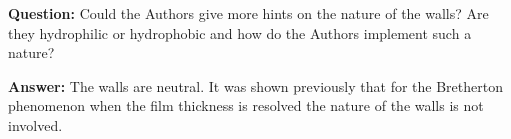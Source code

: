 \documentclass{article}
\begin{document}
\textbf{Question:} Could the Authors give more hints on the nature of the walls? Are they hydrophilic or hydrophobic and how do the Authors implement such a nature?

\textbf{Answer:} The walls are neutral. It was shown previously \cite{kuzmin-binary2d} that for the Bretherton phenomenon when the film thickness is resolved the nature of the walls is not involved.


\end{document}
